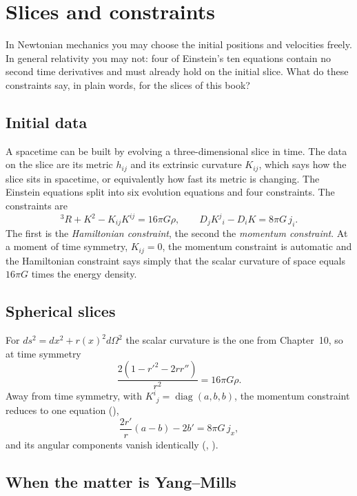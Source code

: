 \chapter{Slices and constraints}\label{ch:constraints}

\begin{questionbox}
In Newtonian mechanics you may choose the initial positions and velocities freely. In general relativity you may not: four of Einstein's ten equations contain no second time derivatives and must already hold on the initial slice. What do these constraints say, in plain words, for the slices of this book?
\end{questionbox}

\section{Initial data}

A spacetime can be built by evolving a three-dimensional slice in time. The data on the slice are its metric $h_{ij}$ and its extrinsic curvature $K_{ij}$, which says how the slice sits in spacetime, or equivalently how fast its metric is changing. The Einstein equations split into six evolution equations and four constraints. The constraints are
\[
{}^3\!R+K^2-K_{ij}K^{ij}=16\pi G\rho,\qquad D_jK^j{}_i-D_iK=8\pi G\,j_i .
\]
The first is the \emph{Hamiltonian constraint}, the second the \emph{momentum constraint}. At a moment of time symmetry, $K_{ij}=0$, the momentum constraint is automatic and the Hamiltonian constraint says simply that the scalar curvature of space equals $16\pi G$ times the energy density.

\section{Spherical slices}

For $ds^2=dx^2+r(x)^2d\Omega^2$ the scalar curvature is the one from Chapter~10, so at time symmetry
\begin{equation}\label{eq:hamconstr}
\frac{2(1-r'^2-2rr'')}{r^2}=16\pi G\rho .
\end{equation}
Away from time symmetry, with $K^i{}_j=\operatorname{diag}(a,b,b)$, the momentum constraint reduces to one equation (),
\[
\frac{2r'}{r}(a-b)-2b'=8\pi G\,j_x ,
\]
and its angular components vanish identically (, ).

\section{When the matter is Yang--Mills}

